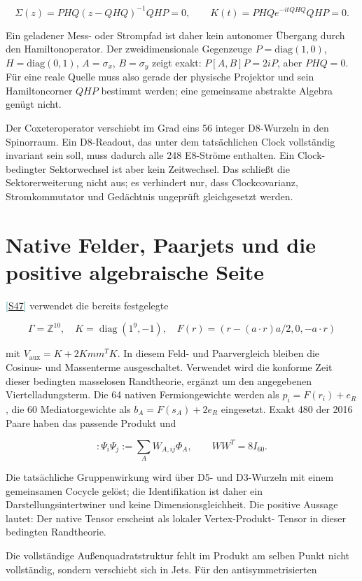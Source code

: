 \documentclass[11pt,a4paper,oneside,parskip=half,headings=normal,numbers=noenddot,bibliography=totoc]{scrreprt}
\newcommand{\src}[1]{\textcolor{teal}{\small[\hyperref[s:#1]{S#1}]}}
\begin{document}
\[
 \Sigma(z)=PHQ(z-QHQ)^{-1}QHP=0,\qquad
 K(t)=PHQe^{-itQHQ}QHP=0.
\]

Ein geladener Mess- oder Strompfad ist daher kein autonomer Übergang durch
den Hamiltonoperator. Der zweidimensionale Gegenzeuge \(P=\mathrm{diag}(1,0)\),
\(H=\mathrm{diag}(0,1)\), \(A=\sigma_x\), \(B=\sigma_y\) zeigt exakt:
\(P[A,B]P=2iP\), aber \(PHQ=0\). Für eine reale Quelle muss also gerade der
physische Projektor und sein Hamiltoncorner \(QHP\) bestimmt werden; eine
gemeinsame abstrakte Algebra genügt nicht.

Der Coxeteroperator verschiebt im Grad eins 56 integer D8-Wurzeln in den
Spinorraum. Ein D8-Readout, das unter dem tatsächlichen Clock vollständig
invariant sein soll, muss dadurch alle 248 E8-Ströme enthalten. Ein Clock-
bedingter Sektorwechsel ist aber kein Zeitwechsel. Das schließt die
Sektorerweiterung nicht aus; es verhindert nur, dass Clockcovarianz,
Stromkommutator und Gedächtnis ungeprüft gleichgesetzt werden.

\section{Native Felder, Paarjets und die positive algebraische Seite}

\src{47} verwendet die bereits festgelegte

\[
 \Gamma=\mathbb Z^{10},\quad K=\operatorname{diag}(1^9,-1),\quad
 F(r)=(r-(a\cdot r)a/2,0,-a\cdot r)
\]

mit \(V_\mathrm{aux}=K+2Kmm^TK\). In diesem Feld- und Paarvergleich bleiben die Cosinus- und Massenterme ausgeschaltet. Verwendet wird die konforme Zeit dieser bedingten masselosen Randtheorie, ergänzt um den angegebenen Viertelladungsterm. Die 64 nativen Fermiongewichte werden als
\(p_i=F(r_i)+e_R\), die 60 Mediatorgewichte als \(b_A=F(s_A)+2e_R\)
eingesetzt. Exakt 480 der 2016 Paare haben das passende Produkt und

\[
 :\Psi_i\Psi_j:=\sum_AW_{A,ij}\Phi_A,\qquad WW^T=8I_{60}.
\]

Die tatsächliche Gruppenwirkung wird über D5- und D3-Wurzeln mit einem
gemeinsamen Cocycle gelöst; die Identifikation ist daher ein
Darstellungsintertwiner und keine Dimensionsgleichheit. Die positive
Aussage lautet: Der native Tensor erscheint als lokaler Vertex-Produkt-
Tensor in dieser bedingten Randtheorie.

Die vollständige Außenquadratstruktur fehlt im Produkt am selben Punkt nicht
vollständig, sondern verschiebt sich in Jets. Für den antisymmetrisierten
\end{document}
